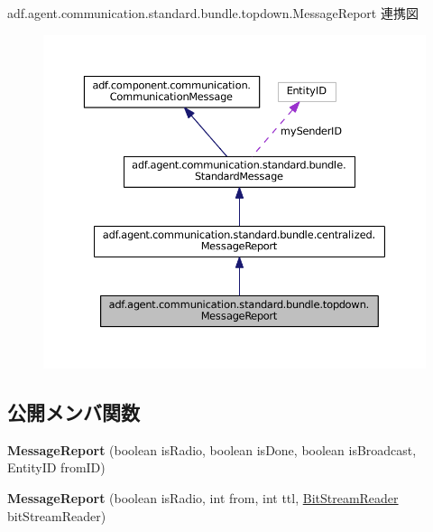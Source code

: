 adf.\+agent.\+communication.\+standard.\+bundle.\+topdown.\+Message\+Report 連携図
\nopagebreak
\begin{figure}[H]
\begin{center}
\leavevmode
\includegraphics[width=350pt]{classadf_1_1agent_1_1communication_1_1standard_1_1bundle_1_1topdown_1_1MessageReport__coll__graph}
\end{center}
\end{figure}
\subsection*{公開メンバ関数}
\begin{DoxyCompactItemize}
\item 
\hypertarget{classadf_1_1agent_1_1communication_1_1standard_1_1bundle_1_1topdown_1_1MessageReport_a9ade58ec0aa0cb99bd8c241964296896}{}\label{classadf_1_1agent_1_1communication_1_1standard_1_1bundle_1_1topdown_1_1MessageReport_a9ade58ec0aa0cb99bd8c241964296896} 
{\bfseries Message\+Report} (boolean is\+Radio, boolean is\+Done, boolean is\+Broadcast, Entity\+ID from\+ID)
\item 
\hypertarget{classadf_1_1agent_1_1communication_1_1standard_1_1bundle_1_1topdown_1_1MessageReport_aa6ad7e2e011615f7d97d928eb3335a90}{}\label{classadf_1_1agent_1_1communication_1_1standard_1_1bundle_1_1topdown_1_1MessageReport_aa6ad7e2e011615f7d97d928eb3335a90} 
{\bfseries Message\+Report} (boolean is\+Radio, int from, int ttl, \hyperlink{classadf_1_1component_1_1communication_1_1util_1_1BitStreamReader}{Bit\+Stream\+Reader} bit\+Stream\+Reader)
\end{DoxyCompactItemize}

